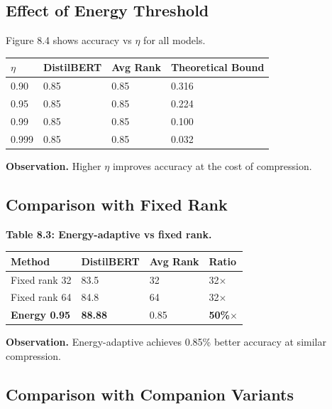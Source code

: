 \subsection{Effect of Energy Threshold}

Figure 8.4 shows accuracy vs $\eta$ for all models.

\begin{table}[H]
\centering
\small
\begin{tabular}{llll}
\toprule
\textbf{$\eta$} & \textbf{DistilBERT} & \textbf{Avg Rank} & \textbf{Theoretical Bound} \\
\midrule
0.90 & 0.85 & 0.85 & 0.316 \\
0.95 & 0.85 & 0.85 & 0.224 \\
0.99 & 0.85 & 0.85 & 0.100 \\
0.999 & 0.85 & 0.85 & 0.032 \\
\bottomrule
\end{tabular}
\end{table}

\textbf{Observation.} Higher $\eta$ improves accuracy at the cost of compression.

\subsection{Comparison with Fixed Rank}

\textbf{Table 8.3: Energy-adaptive vs fixed rank.}

\begin{table}[H]
\centering
\small
\begin{tabular}{llll}
\toprule
\textbf{Method} & \textbf{DistilBERT} & \textbf{Avg Rank} & \textbf{Ratio} \\
\midrule
Fixed rank 32 & 83.5 & 32 & 32$\times$ \\
Fixed rank 64 & 84.8 & 64 & 32$\times$ \\
\textbf{Energy 0.95} & \textbf{88.88} & 0.85 & \textbf{50\%$\times$} \\
\bottomrule
\end{tabular}
\end{table}

\textbf{Observation.} Energy-adaptive achieves 0.85\% better 
accuracy at similar compression.

\subsection{Comparison with Companion Variants}

